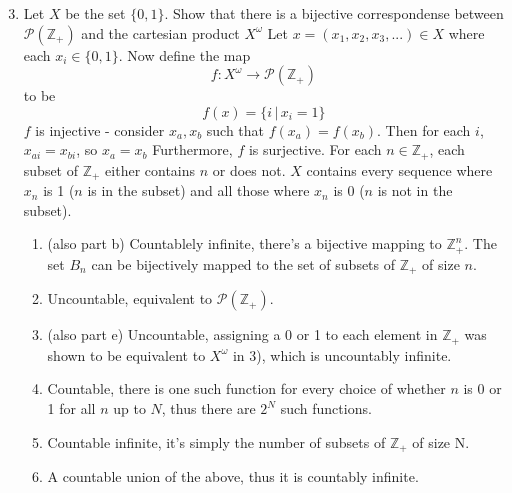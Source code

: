 \documentclass[12pt,letterpaper]{article}
\newcommand{\n}{\break}
\begin{document}
\raggedright
\begin{enumerate}
  \setcounter{enumi}{2}
  \item Let $X$ be the set $\{0,1\}$. Show that there is a bijective correspondense between $\mathcal{P}(\mathbb{Z}_+)$ and the cartesian product $X^\omega$ \n
  \indent Let $x=(x_1, x_2, x_3, ...)\in X$ where each $x_i\in \{0,1\}$. \n
  Now define the map
  $$f : X^\omega \rightarrow \mathcal{P}(\mathbb{Z}_+)$$
  to be
  $$f(x) = \{i\, |\, x_i=1\}$$
  $f$ is injective - consider $x_a, x_b$ such that $f(x_a)=f(x_b)$.
  Then for each $i$, $x_{ai}=x_{bi}$, so $x_a=x_b$ \n
  Furthermore, $f$ is surjective. For each $n\in\mathbb{Z}_+$, each subset of $\mathbb{Z}_+$ either contains $n$ or does not. $X$ contains every sequence where $x_n$ is 1 ($n$ is in the subset) and all those where $x_n$ is 0 ($n$ is not in the subset).
  \addtocounter{enumi}{1}
  \begin{enumerate}
    \item (also part b) Countablely infinite, there's a bijective mapping to $\mathbb{Z}_+^n$.
    The set $B_n$ can be bijectively mapped to the set of subsets of $\mathbb{Z}_+$ of size $n$.
    \addtocounter{enumii}{1}
    \item Uncountable, equivalent to $\mathcal{P}(\mathbb{Z}_+)$.
    \item (also part e) Uncountable, assigning a 0 or 1 to each element in $\mathbb{Z}_+$ was shown to be equivalent to $X^\omega$ in 3), which is uncountably infinite.
    \addtocounter{enumii}{1}
    \item Countable, there is one such function for every choice of whether $n$ is 0 or 1 for all $n$ up to $N$, thus there are $2^N$ such functions.
    \item Countable infinite, it's simply the number of subsets of $\mathbb{Z}_+$ of size N.
    \item A countable union of the above, thus it is countably infinite.
  \end{enumerate}
\end{enumerate}
\end{document}

